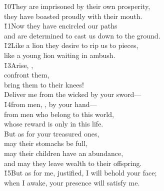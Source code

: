 \begin{poetry}
\poeml \v{10}They are imprisoned by their own prosperity, \\
\poemll    they have boasted proudly with their mouth. \\
\poeml \v{11}Now they have encircled our paths \\
\poemll    and are determined to cast us down to the ground. \\
\poeml \v{12}Like a lion they desire to rip us to pieces, \\
\poemll    like a young lion waiting in ambush. \\
\poeml \v{13}Arise, , \\
\poemll    confront them, \\
\poemlll       bring them to their knees! \\
\poeml Deliver me from the wicked by your sword--- \\
\poeml \v{14}from men, , by your hand--- \\
\poeml from men who belong to this world, \\
\poemll    whose reward is only in this life. \\
\poeml But as for your treasured ones, \\
\poemll    may their stomachs be full, \\
\poeml may their children have an abundance, \\
\poemll    and may they leave wealth to their offspring. \\
\poeml \v{15}But as for me, justified, I will behold your face; \\
\poemll    when I awake, your presence will satisfy me.
\end{poetry}

